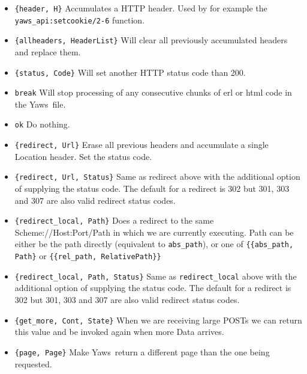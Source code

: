 \documentclass[11pt,oneside,english]{book}
\newcommand{\Yaws}            %
        {{\sc Yaws}}
\begin{document}
\begin{itemize}
\item       \verb+{header, H}+
              Accumulates a HTTP header. Used by for example  the
              \verb+yaws_api:setcookie/2-6+ function.

\item       \verb+{allheaders, HeaderList}+
              Will  clear  all previously accumulated headers and
              replace them.

\item       \verb+{status, Code}+
              Will set another HTTP status code than 200.

\item       \verb+break+  Will stop processing of any consecutive  chunks  of
              erl or html code in the \Yaws\  file.

\item       \verb+ok+     Do nothing.

\item       \verb+{redirect, Url}+
              Erase  all previous headers and accumulate a single
              Location header. Set the status code.

\item       \verb+{redirect, Url, Status}+
              Same as redirect above with the additional
	      option of supplying the status code. The default
	      for a redirect is 302 but 301, 303 and 307 are also
	      valid redirect status codes.

\item       \verb+{redirect_local, Path}+
              Does a redirect to the same Scheme://Host:Port/Path in
              which we are currently executing. Path can be either be
              the path directly (equivalent to \verb+abs_path+), or
              one of \verb+{{abs_path, Path}+ or
              \verb+{{rel_path, RelativePath}}+

\item       \verb+{redirect_local, Path, Status}+
              Same as \verb+redirect_local+ above with the additional
	      option of supplying the status code. The default
	      for a redirect is 302 but 301, 303 and 307 are also
	      valid redirect status codes.

\item       \verb+{get_more, Cont, State}+
              When  we  are  receiving  large POSTs we can return
              this value and be  invoked  again  when  more  Data
              arrives.

\item       \verb+{page, Page}+
              Make \Yaws\  return a different page than the one being
              requested.


\end{itemize}
\end{document}
